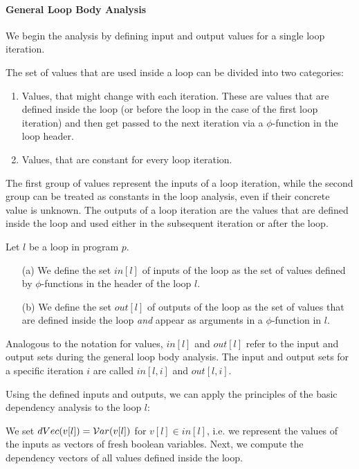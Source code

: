 \paragraph{General Loop Body Analysis}
We begin the analysis by defining input and output values for a single loop iteration. 

The set of values that are used inside a loop can be divided into two categories:
\begin{enumerate}
    \item Values, that might change with each iteration. These are values that are defined inside the loop (or before the loop in the case of the first loop iteration) and then get passed to the next iteration via a $\phi$-function in the loop header.
    \item Values, that are constant for every loop iteration.
\end{enumerate}

The first group of values represent the inputs of a loop iteration, while the second group can be treated as constants in the loop analysis, even if their concrete value is unknown. The outputs of a loop iteration are the values that are defined inside the loop and used either in the subsequent iteration or after the loop.

\begin{definition}
    Let $l$ be a loop in program $p$.
    \begin{itemize}
        \item[(a)] We define the set $in[l]$ of inputs of the loop as the set of values defined by $\phi$-functions in the header of the loop $l$.
        \item[(b)] We define the set $out[l]$ of outputs of the loop as the set of values that are defined inside the loop \emph{and} appear as arguments in a $\phi$-function in $l$.
    \end{itemize}
\end{definition}

Analogous to the notation for values, $in[l]$ and $out[l]$ refer to the input and output sets during the general loop body analysis. The input and output sets for a specific iteration $i$ are called $in[l, i]$ and $out[l, i]$.

Using the defined inputs and outputs, we can apply the principles of the basic dependency analysis to the loop $l$:

We set $dVec(v[l]) = \mathcal{V}ar(v[l])$ for $v[l] \in in[l]$, i.e. we represent the values of the inputs as vectors of fresh boolean variables. Next, we compute the dependency vectors of all values defined inside the loop.

